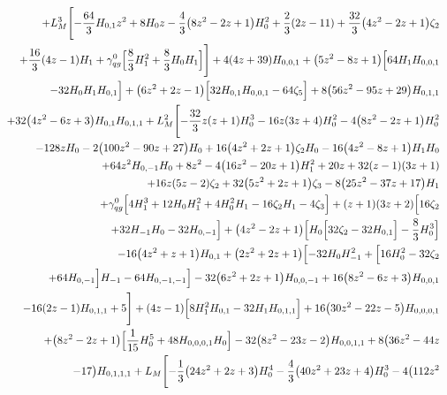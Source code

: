 \begin{eqnarray}
\nonumber \\ &&
+L_M^3 \Biggl[-\frac{64}{3} H_{0,1} z^2+8 H_0z-\frac{4}{3} \big(8 z^2-2 z+1\big) H_0^2+\frac{2}{3} (2 z-11)+\frac{32}{3}\big(4 z^2-2 z+1\big) \zeta_2
\nonumber \\ &&
+\frac{16}{3} (4 z-1)H_1
+{\gamma}_{qg}^{0} \Bigl[\frac{8}{3} H_1^2+\frac{8}{3} H_0H_1\Bigr]\Biggr]
+4 (4 z+39) H_{0,0,1}+\big(5 z^2-8 z+1\big) \Bigl[64 H_1H_{0,0,1}
\nonumber \\ &&
-32 H_0 H_1 H_{0,1}\Bigr]+\big(6 z^2+2 z-1\big) \Bigl[32 H_{0,1}H_{0,0,1}-64 \zeta_5\Bigr]+8 \big(56 z^2-95 z+29\big) H_{0,1,1}
\nonumber \\ &&
+32 \big(4z^2-6 z+3\big) H_{0,1} H_{0,1,1}
+L_M^2 \Biggl[-\frac{32}{3}  z (z+1) H_0^3-16 z (3 z+4) H_0^2-4 \big(8 z^2-2 z+1\big) H_0^2
\nonumber \\ &&
-128  z H_0
-2\big(100 z^2-90 z+27\big) H_0+16  \big(4 z^2+2 z+1\big) \zeta_2H_0-16 \big(4 z^2-8 z+1\big) H_1 H_0
\nonumber \\ &&
+64  z^2 H_{0,-1} H_0
+8 z^2-4\big(16 z^2-20 z+1\big) H_1^2+20 z+32  (z-1) (3 z+1)
\nonumber \\ &&
+16 z (5 z-2)\zeta_2+32  \big(5 z^2+2 z+1\big) \zeta_3-8 \big(25 z^2-37z+17\big) H_1
\nonumber \\ &&
+{\gamma}_{qg}^{0} \Bigl[4 H_1^3+12 H_0 H_1^2+4 H_0^2 H_1-16\zeta_2 H_1-4 \zeta_3\Bigr]+(z+1) (3 z+2) \Bigl[16  \zeta_2
\nonumber \\ &&
+32  H_{-1} H_0-32  H_{0,-1}\Bigr]+\big(4 z^2-2 z+1\big) \Bigl[H_0\Bigl[32 \zeta_2-32 H_{0,1}\Bigr]-\frac{8}{3} H_0^3\Bigr]
\nonumber \\ &&
-16 \big(4z^2+z+1\big) H_{0,1}+\big(2 z^2+2 z+1\big) \Bigl[-32  H_0H_{-1}^2+\Bigl[16  H_0^2-32  \zeta_2
\nonumber \\ &&
+64  H_{0,-1}\Bigr]H_{-1}-64  H_{0,-1,-1}\Bigr]-32  \big(6 z^2+2 z+1\big)H_{0,0,-1}+16 \big(8 z^2-6 z+3\big) H_{0,0,1}
\nonumber \\ &&
-16 (2 z-1) H_{0,1,1}+5\Biggr]
+(4z-1) \Bigl[8 H_1^2 H_{0,1}-32 H_1 H_{0,1,1}\Bigr]+16 \big(30 z^2-22 z-5\big)H_{0,0,0,1}
\nonumber \\ &&
+\big(8 z^2-2 z+1\big) \Bigl[\frac{1}{15} H_0^5+48 H_{0,0,0,1}H_0\Bigr]
-32 \big(8 z^2-23 z-2\big) H_{0,0,1,1}
+8 \big(36 z^2-44 z
\nonumber \\ && 
-17\big)H_{0,1,1,1}
+L_M \Biggl[-\frac{1}{3} \big(24 z^2+2 z+3\big)H_0^4-\frac{4}{3} \big(40 z^2+23 z+4\big) H_0^3-4 
\big(112 z^2
\nonumber \\ &&

\end{eqnarray}
